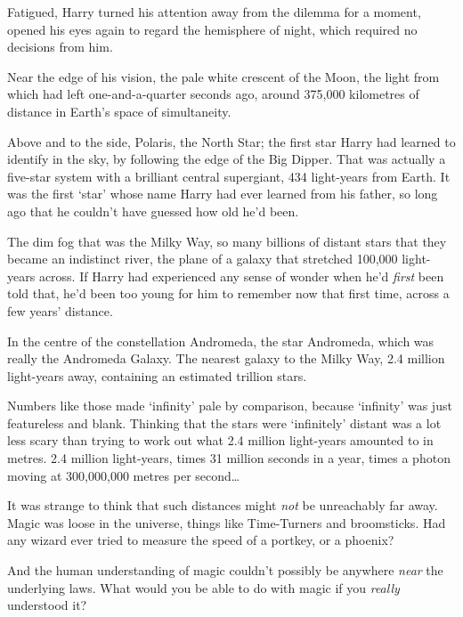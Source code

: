 Fatigued, Harry turned his attention away from the dilemma for a moment, opened his eyes again to regard the hemisphere of night, which required no decisions from him.

Near the edge of his vision, the pale white crescent of the Moon, the light from which had left one-and-a-quarter seconds ago, around 375,000 kilometres of distance in Earth’s space of simultaneity.

Above and to the side, Polaris, the North Star; the first star Harry had learned to identify in the sky, by following the edge of the Big Dipper. That was actually a five-star system with a brilliant central supergiant, 434 light-years from Earth. It was the first ‘star’ whose name Harry had ever learned from his father, so long ago that he couldn’t have guessed how old he’d been.

The dim fog that was the Milky Way, so many billions of distant stars that they became an indistinct river, the plane of a galaxy that stretched 100,000 light-years across. If Harry had experienced any sense of wonder when he’d \emph{first} been told that, he’d been too young for him to remember now that first time, across a few years’ distance.

In the centre of the constellation Andromeda, the star Andromeda, which was really the Andromeda Galaxy. The nearest galaxy to the Milky Way, 2.4 million light-years away, containing an estimated trillion stars.

Numbers like those made ‘infinity’ pale by comparison, because ‘infinity’ was just featureless and blank. Thinking that the stars were ‘infinitely’ distant was a lot less scary than trying to work out what 2.4 million light-years amounted to in metres. 2.4 million light-years, times 31 million seconds in a year, times a photon moving at 300,000,000 metres per second…

It was strange to think that such distances might \emph{not} be unreachably far away. Magic was loose in the universe, things like Time-Turners and broomsticks. Had any wizard ever tried to measure the speed of a portkey, or a phoenix?

And the human understanding of magic couldn’t possibly be anywhere \emph{near} the underlying laws. What would you be able to do with magic if you \emph{really} understood it?

